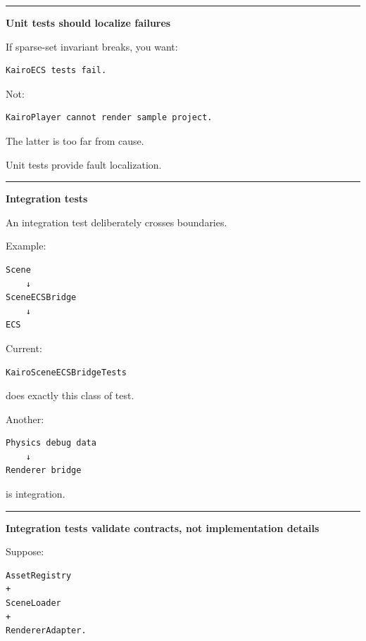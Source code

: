 \begin{center}\rule{0.5\linewidth}{0.5pt}\end{center}

\textbf{Unit tests should localize failures}

If sparse-set invariant breaks, you want:

\begin{verbatim}
KairoECS tests fail.
\end{verbatim}

Not:

\begin{verbatim}
KairoPlayer cannot render sample project.
\end{verbatim}

The latter is too far from cause.

Unit tests provide fault localization.

\begin{center}\rule{0.5\linewidth}{0.5pt}\end{center}

\textbf{Integration tests}

An integration test deliberately crosses boundaries.

Example:

\begin{verbatim}
Scene
    ↓
SceneECSBridge
    ↓
ECS
\end{verbatim}

Current:

\begin{verbatim}
KairoSceneECSBridgeTests
\end{verbatim}

does exactly this class of test.

Another:

\begin{verbatim}
Physics debug data
    ↓
Renderer bridge
\end{verbatim}

is integration.

\begin{center}\rule{0.5\linewidth}{0.5pt}\end{center}

\textbf{Integration tests validate contracts, not implementation details}

Suppose:

\begin{verbatim}
AssetRegistry
+
SceneLoader
+
RendererAdapter.
\end{verbatim}

